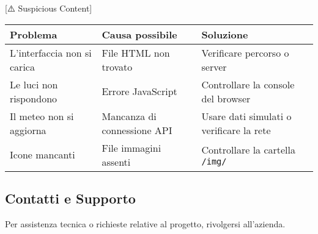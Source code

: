 [⚠️ Suspicious Content] \documentclass[a4paper,12pt]{article}
\begin{document}
\begin{tabular}{|p{5cm}|p{5cm}|p{5cm}|}
\hline
\textbf{Problema} & \textbf{Causa possibile} & \textbf{Soluzione} \\
\hline
L’interfaccia non si carica & File HTML non trovato & Verificare percorso o server \\
\hline
Le luci non rispondono & Errore JavaScript & Controllare la console del browser \\
\hline
Il meteo non si aggiorna & Mancanza di connessione API & Usare dati simulati o verificare la rete \\
\hline
Icone mancanti & File immagini assenti & Controllare la cartella \texttt{/img/} \\
\hline
\end{tabular}

\subsection{Contatti e Supporto}

Per assistenza tecnica o richieste relative al progetto, rivolgersi all'azienda.
\end{document}
